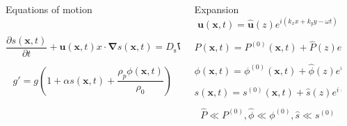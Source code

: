 \documentclass[final]{beamer} %
\begin{document}
\begin{frame}[t]
\begin{columns}[t]
\begin{column}{0.6\paperwidth}
\begin{columns}[t]
\begin{column}{0.43\paperwidth}
\begin{block}{Equations of motion}
\begin{columns}[t]
\begin{column}{0.3\paperwidth}
                    $$ \frac{\partial s(\mathbf{x}, t)}{\partial t} +
                    \mathbf{u}(\mathbf{x}, t)x \cdot \mathbf{\nabla} s(\mathbf{x}, t) =
                    D_{\text{s}} \nabla^{2} s(\mathbf{x}, t) $$

                    $$ g' = g \left(1 + \alpha s(\mathbf{x}, t) 
                    + \frac{\rho_{p} \phi(\mathbf{x}, t)}{\rho_{0}} \right) $$

              \end{column}

            \end{columns}
          \end{block}
        \end{column}
        \begin{column}{0.17\paperwidth}
          \begin{block}{Expansion}
            $$ \mathbf{u}(\mathbf{x}, t) = \mathbf{\hat{u}}(z) e^{i(k_{x} x + k_{y} y - \omega t)}$$

            $$ P(\mathbf{x}, t) = P^{(0)}(\mathbf{x}, t) +
            \hat{P}(z) e^{i(k x - \omega t)}$$

            $$ \phi(\mathbf{x}, t) = \phi^{(0)}(\mathbf{x}, t) +
            \hat{\phi}(z) e^{i(k x - \omega t)}$$
      
            $$ s(\mathbf{x}, t) = s^{(0)}(\mathbf{x}, t) +
            \hat{s}(z) e^{i(k x - \omega t)}$$

            $$\hat{P} \ll P^{(0)}, \hat{\phi} \ll \phi^{(0)}, \hat{s} \ll s^{(0)}$$
          \end{block}

        \end{column}
      \end{columns}
      
    \end{column}

    \begin{column}{0.3\paperwidth}

      \begin{columns}[t]
        \begin{column}{0.12\paperwidth}

          \vspace{-2.2cm}


\end{column}
\end{columns}
\end{column}
\end{columns}
\end{frame}
\end{document}
